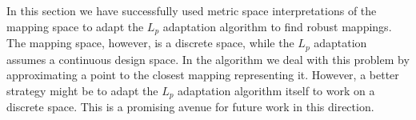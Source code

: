 In this section we have successfully used metric space interpretations of the mapping space to adapt the $L_p$ adaptation algorithm to find robust mappings.
The mapping space, however, is a discrete space, while the $L_p$ adaptation assumes a continuous design space.
In the algorithm we deal with this problem by approximating a point to the closest mapping representing it.
However, a better strategy might be to adapt the $L_p$ adaptation algorithm itself to work on a discrete space.
This is a promising avenue for future work in this direction.
